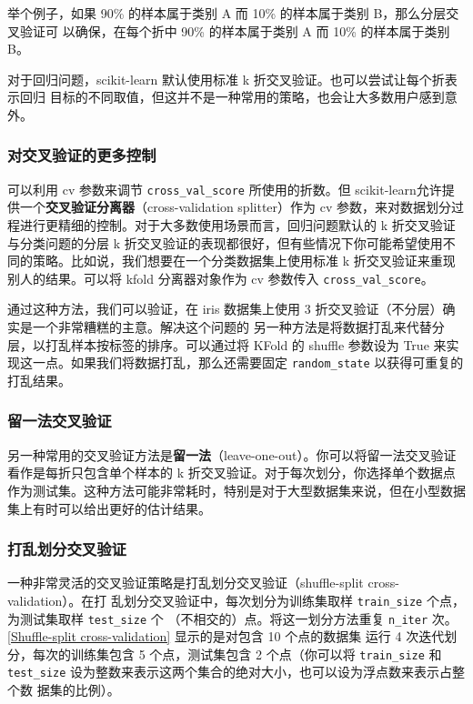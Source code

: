 举个例子，如果 90\% 的样本属于类别 A 而 10\% 的样本属于类别 B，那么分层交叉验证可
以确保，在每个折中 90\% 的样本属于类别 A 而 10\% 的样本属于类别 B。

对于回归问题，scikit-learn 默认使用标准 k 折交叉验证。也可以尝试让每个折表示回归
目标的不同取值，但这并不是一种常用的策略，也会让大多数用户感到意外。

\subsubsection{对交叉验证的更多控制}

可以利用 cv 参数来调节 \verb|cross_val_score| 所使用的折数。但 scikit-learn允许提供一个\textbf{交叉验证分离器}（cross-validation splitter）作为 cv 参数，来对数据划分过程进行更精细的控制。对于大多数使用场景而言，回归问题默认的 k 折交叉验证与分类问题的分层 k 折交叉验证的表现都很好，但有些情况下你可能希望使用不同的策略。比如说，我们想要在一个分类数据集上使用标准 k 折交叉验证来重现别人的结果。可以将 kfold 分离器对象作为 cv 参数传入 \verb|cross_val_score|。

通过这种方法，我们可以验证，在 iris 数据集上使用 3 折交叉验证（不分层）确实是一个非常糟糕的主意。解决这个问题的
另一种方法是将数据打乱来代替分层，以打乱样本按标签的排序。可以通过将 KFold 的 shuffle 参数设为 True 来实现这一点。如果我们将数据打乱，那么还需要固定 \verb|random_state| 以获得可重复的打乱结果。

\subsubsection{留一法交叉验证}
另一种常用的交叉验证方法是\textbf{留一法}（leave-one-out）。你可以将留一法交叉验证看作是每折只包含单个样本的 k 折交叉验证。对于每次划分，你选择单个数据点作为测试集。这种方法可能非常耗时，特别是对于大型数据集来说，但在小型数据集上有时可以给出更好的估计结果。
\subsubsection{打乱划分交叉验证}
一种非常灵活的交叉验证策略是打乱划分交叉验证（shuffle-split cross-validation）。在打
乱划分交叉验证中，每次划分为训练集取样 \verb|train_size| 个点，为测试集取样 \verb|test_size| 个
（不相交的）点。将这一划分方法重复 \verb|n_iter| 次。\autoref{Shuffle-split cross-validation} 显示的是对包含 10 个点的数据集
运行 4 次迭代划分，每次的训练集包含 5 个点，测试集包含 2 个点（你可以将 \verb|train_size|
和 \verb|test_size| 设为整数来表示这两个集合的绝对大小，也可以设为浮点数来表示占整个数
据集的比例）。

